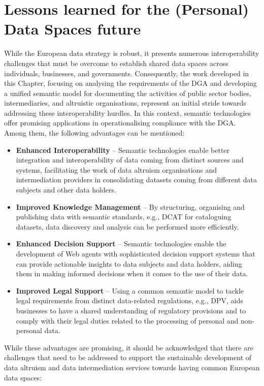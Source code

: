 \section{Lessons learned for the (Personal) Data Spaces future}
\label{sec:lessons}

While the European data strategy is robust, it presents numerous interoperability challenges that must be overcome to establish shared data spaces across individuals, businesses, and governments.
Consequently, the work developed in this Chapter, focusing on analysing the requirements of the DGA and developing a unified semantic model for documenting the activities of public sector bodies, intermediaries, and altruistic organisations, represent an initial stride towards addressing these interoperability hurdles.
In this context, semantic technologies offer promising applications in operationalising compliance with the DGA.
Among them, the following advantages can be mentioned:
\begin{itemize}
    \item \textbf{Enhanced Interoperability} -- Semantic technologies enable better integration and interoperability of data coming from distinct sources and systems, facilitating the work of data altruism organisations and intermediation providers in consolidating datasets coming from different data subjects and other data holders.
    \item \textbf{Improved Knowledge Management} -- By structuring, organising and publishing data with semantic standards, e.g., DCAT for cataloguing datasets, data discovery and analysis can be performed more efficiently.
    \item \textbf{Enhanced Decision Support} -- Semantic technologies enable the development of Web agents with sophisticated decision support systems that can provide actionable insights to data subjects and data holders, aiding them in making informed decisions when it comes to the use of their data.
    \item \textbf{Improved Legal Support} -- Using a common semantic model to tackle legal requirements from distinct data-related regulations, e.g., DPV, aids businesses to have a shared understanding of regulatory provisions and to comply with their legal duties related to the processing of personal and non-personal data.
\end{itemize}

While these advantages are promising, it should be acknowledged that there are challenges that need to be addressed to support the sustainable development of data altruism and data intermediation services towards having common European data spaces:

